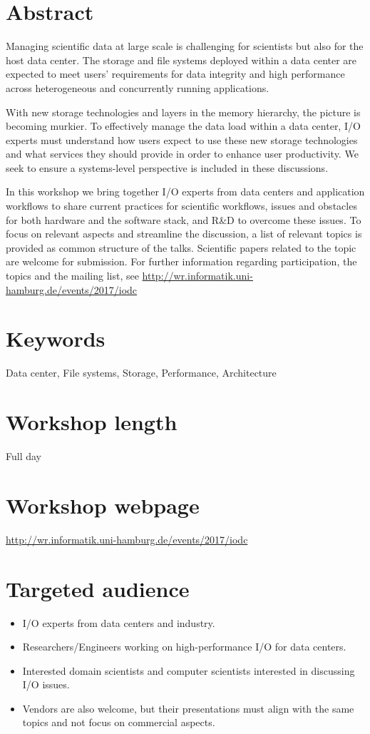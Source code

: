 \documentclass[a4paper,10pt]{article}
\begin{document}
\section{Abstract} 
Managing scientific data at large scale is challenging for scientists but also for the host data center.
The storage and file systems deployed within a data center are expected to meet users' requirements for data integrity and high performance across heterogeneous and concurrently running applications. 

With new storage technologies and layers in the memory hierarchy, the picture is becoming murkier. 
To effectively manage the data load within a data center, I/O experts must understand how users expect to use these new storage technologies and what services they should provide in order to enhance user productivity. We seek to ensure a systems-level perspective is included in these discussions.

In this workshop we bring together I/O experts from data centers and application workflows to share current practices for scientific workflows, issues and obstacles for both hardware and the software stack, and R\&D to overcome these issues. 
To focus on relevant aspects and streamline the discussion, a list of relevant topics is provided as common structure of the talks. 
Scientific papers related to the topic are welcome for submission.
For further information regarding participation, the topics and the mailing list, see \url{http://wr.informatik.uni-hamburg.de/events/2017/iodc}

\section{Keywords} 
Data center, File systems, Storage, Performance, Architecture

\section{Workshop length}
Full day %

\section{Workshop webpage}
\url{http://wr.informatik.uni-hamburg.de/events/2017/iodc}


\section{Targeted audience}
\begin{itemize}
\item I/O experts from data centers and industry.
\item Researchers/Engineers working on high-performance I/O for data centers.
\item Interested domain scientists and computer scientists interested in discussing I/O issues.
\item Vendors are also welcome, but their presentations must align with the same topics and not focus on commercial aspects.
\end{itemize}
\end{document}
